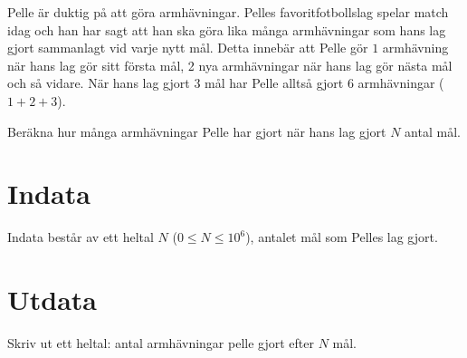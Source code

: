 Pelle är duktig på att göra armhävningar. Pelles favoritfotbollslag spelar match idag och
han har sagt att han ska göra lika många armhävningar som hans lag gjort sammanlagt vid
varje nytt mål. Detta innebär att Pelle gör $1$ armhävning när hans lag gör sitt första mål,
2 nya armhävningar när hans lag gör nästa mål och så vidare. När hans lag gjort $3$ mål har
Pelle alltså gjort $6$ armhävningar ($1+2+3$).

Beräkna hur många armhävningar Pelle har gjort när hans lag gjort $N$ antal mål.

\section*{Indata}
Indata består av ett heltal $N$ ($0 \leq N \leq 10^6$), antalet mål som Pelles lag gjort.

\section*{Utdata}
Skriv ut ett heltal: antal armhävningar pelle gjort efter $N$ mål.

